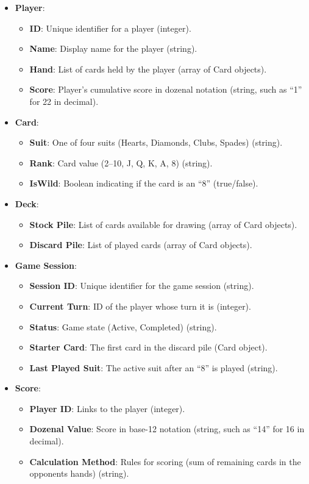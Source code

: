 \documentclass[12pt]{article}
\begin{document}
\begin{itemize}
    \item \textbf{Player}:
    \begin{itemize}
        \item \textbf{ID}: Unique identifier for a player (integer).
        \item \textbf{Name}: Display name for the player (string).
        \item \textbf{Hand}: List of cards held by the player (array of Card objects).
        \item \textbf{Score}: Player's cumulative score in dozenal notation (string, such as ``1'' for 22 in decimal).
    \end{itemize}
    \item \textbf{Card}:
    \begin{itemize}
        \item \textbf{Suit}: One of four suits (Hearts, Diamonds, Clubs, Spades) (string).
        \item \textbf{Rank}: Card value (2--10, J, Q, K, A, 8) (string).
        \item \textbf{IsWild}: Boolean indicating if the card is an ``8'' (true/false).
    \end{itemize}
    \item \textbf{Deck}:
    \begin{itemize}
        \item \textbf{Stock Pile}: List of cards available for drawing (array of Card objects).
        \item \textbf{Discard Pile}: List of played cards (array of Card objects).
    \end{itemize}
    \item \textbf{Game Session}:
    \begin{itemize}
        \item \textbf{Session ID}: Unique identifier for the game session (string).
        \item \textbf{Current Turn}: ID of the player whose turn it is (integer).
        \item \textbf{Status}: Game state (Active, Completed) (string).
        \item \textbf{Starter Card}: The first card in the discard pile (Card object).
        \item \textbf{Last Played Suit}: The active suit after an ``8'' is played (string).
    \end{itemize}
    \item \textbf{Score}:
    \begin{itemize}
        \item \textbf{Player ID}: Links to the player (integer).
        \item \textbf{Dozenal Value}: Score in base-12 notation (string, such as ``14'' for 16 in decimal).
        \item \textbf{Calculation Method}: Rules for scoring (sum of remaining cards in the opponents hands) (string).
    \end{itemize}
\end{itemize}
\end{document}
